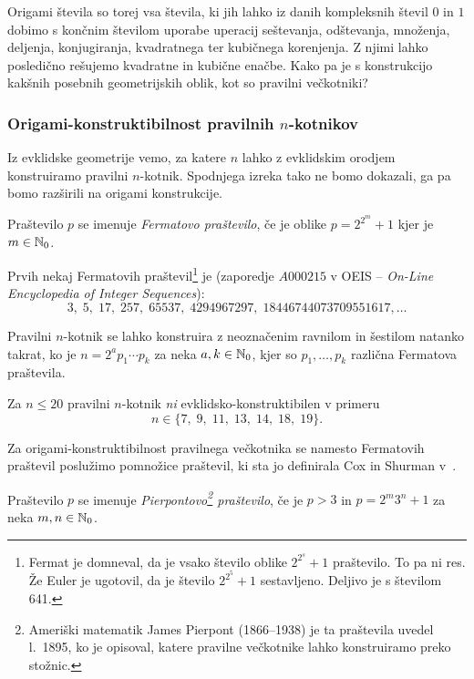Origami števila so torej vsa števila, ki jih lahko iz danih kompleksnih števil $0$ in $1$ dobimo s končnim številom uporabe uperacij seštevanja, odštevanja, množenja, deljenja, konjugiranja, kvadratnega ter kubičnega korenjenja. Z njimi lahko posledično rešujemo kvadratne in kubične enačbe. Kako pa je s konstrukcijo kakšnih posebnih geometrijskih oblik, kot so pravilni večkotniki?

\subsubsection{Origami-konstruktibilnost pravilnih $n$-kotnikov}
\label{podpogl:n_kotniki}

Iz evklidske geometrije vemo, za katere $n$ lahko z evklidskim orodjem konstruiramo pravilni $n$-kotnik. Spodnjega izreka tako ne bomo dokazali, ga pa bomo razširili na origami konstrukcije.

\begin{definicija}
    Praštevilo $p$ se imenuje \emph{Fermatovo praštevilo}, če je oblike $p = 2^{2^m} + 1$ kjer je $m \in \mathbb N_0$.
\end{definicija}
Prvih nekaj Fermatovih praštevil\footnote{Fermat je domneval, da je vsako število oblike $2^{2^s} + 1$ praštevilo. To pa ni res. Že Euler je ugotovil, da je število $2^{2^5} + 1$ sestavljeno. Deljivo je s številom 641.} je (zaporedje $A000215$ v OEIS -- \emph{On-Line Encyclopedia of Integer Sequences}):
$$3,\; 5,\; 17,\; 257,\; 65537,\; 4294967297,\; 18446744073709551617, \ldots $$

\begin{izrek}
    Pravilni $n$-kotnik se lahko konstruira z neoznačenim ravnilom in šestilom natanko takrat, ko je $n = 2^a p_1 \cdots p_k$ za neka $a,k \in \mathbb N_0$, kjer so $p_1, \ldots, p_k$ različna Fermatova praštevila.
\end{izrek}

Za $n \leq 20$ pravilni $n$-kotnik \emph{ni} evklidsko-konstruktibilen v primeru
$$n \in \{ 7,\;9,\;11,\;13,\;14,\;18,\;19 \}.$$

Za origami-konstruktibilnost pravilnega večkotnika se namesto Fermatovih praštevil poslužimo pomnožice praštevil, ki sta jo definirala Cox in Shurman v~\cite{cox2005}.

\begin{definicija}
    Praštevilo $p$ se imenuje \emph{Pierpontovo\footnote{Ameriški matematik James Pierpont (1866--1938) je ta praštevila uvedel l.\ 1895, ko je opisoval, katere pravilne večkotnike lahko konstruiramo preko stožnic.
    } praštevilo}, če je $p > 3$ in $p = 2^m3^n + 1$ za neka $m,n \in \mathbb N_0$.
\end{definicija}

